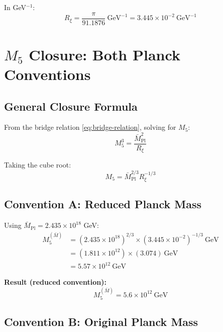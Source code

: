 \documentclass[11pt,a4paper]{article}
\newcommand{\Rxi}{R_\xi}
\newcommand{\Mplbar}{\bar{M}_{\mathrm{Pl}}}
\newcommand{\Mfive}{M_5}
\begin{document}
In GeV$^{-1}$:
\begin{equation}
\Rxi = \frac{\pi}{91.1876}~\mathrm{GeV}^{-1} = 3.445 \times 10^{-2}~\mathrm{GeV}^{-1}
\label{eq:Rxi-GeV}
\end{equation}

\section{$\Mfive$ Closure: Both Planck Conventions}

\subsection{General Closure Formula}

From the bridge relation \eqref{eq:bridge-relation}, solving for $\Mfive$:
\begin{equation}
\Mfive^3 = \frac{\Mplbar^2}{\Rxi}
\label{eq:M5-cubed}
\end{equation}

Taking the cube root:
\begin{equation}
\boxed{\Mfive = \Mplbar^{2/3} \Rxi^{-1/3}}
\label{eq:M5-closure}
\end{equation}

\subsection{Convention A: Reduced Planck Mass}

Using $\Mplbar = 2.435 \times 10^{18}$ GeV:
\begin{align}
\Mfive^{(\bar{M})} &= (2.435 \times 10^{18})^{2/3} \times (3.445 \times 10^{-2})^{-1/3}~\mathrm{GeV} \nonumber\\
&= (1.811 \times 10^{12}) \times (3.074)~\mathrm{GeV} \nonumber\\
&= 5.57 \times 10^{12}~\mathrm{GeV}
\label{eq:M5-reduced}
\end{align}

\textbf{Result (reduced convention):}
\begin{equation}
\boxed{\Mfive^{(\bar{M})} = 5.6 \times 10^{12}~\mathrm{GeV}}
\label{eq:M5-reduced-boxed}
\end{equation}

\subsection{Convention B: Original Planck Mass}
\end{document}
